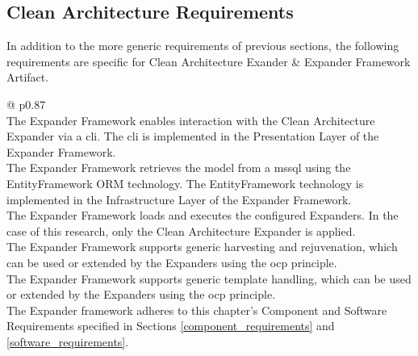 \subsection{Clean Architecture Requirements}

In addition to the more generic requirements of previous sections, the following
requirements are specific for Clean Architecture Exander \& Expander Framework Artifact.

\begin{table}[H]
    \begin{tabular}{@{\makebox[2em][c]{\rownumber\space}}  p{0.87\linewidth}}
        \\ 
    \hline
    The Expander Framework enables interaction with the Clean Architecture Expander via a
    \gls{cli}. The \gls{cli} is implemented in the Presentation Layer of the
    Expander Framework. \\

    The Expander Framework retrieves the model from a \gls{mssql} using the
    EntityFramework ORM technology. The EntityFramework technology is implemented in the
    Infrastructure Layer of the Expander Framework. \\
    
    The Expander Framework loads and executes the configured Expanders. In the case of
    this research, only the Clean Architecture Expander is applied. \\

    The Expander Framework supports generic harvesting and rejuvenation, which can be
    used or extended by the Expanders using the \gls{ocp} principle. \\

    The Expander Framework supports generic template handling, which can be used or
    extended by the Expanders using the \gls{ocp} principle. \\

    The Expander framework adheres to this chapter's Component and Software Requirements
    specified in Sections \ref{component_requirements} and \ref{software_requirements}. \\

    \hline
    \end{tabular}
\caption{Expander Framework Requirements}
\label{table_requirements_expanderframework}
\end{table}

